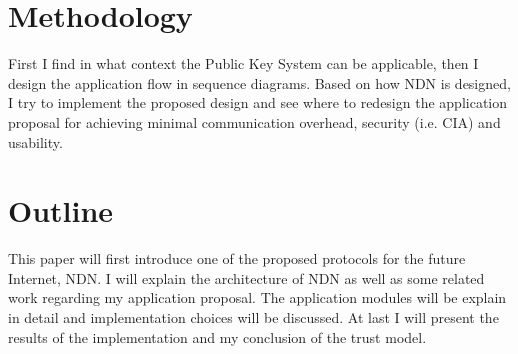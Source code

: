 \section{Methodology}

First I find in what context the Public Key System can be applicable, then I design the application flow in sequence diagrams.
Based on how \gls{NDN} is designed, I try to implement the proposed design and see where to redesign the application proposal for achieving minimal communication overhead, security (i.e. \gls{CIA}) and usability.

\section{Outline}

This paper will first introduce one of the proposed protocols for the future Internet, \gls{NDN}.
I will explain the architecture of \gls{NDN} as well as some related work regarding my application proposal. 
The application modules will be explain in detail and implementation choices will be discussed.
At last I will present the results of the implementation and my conclusion of the trust model.